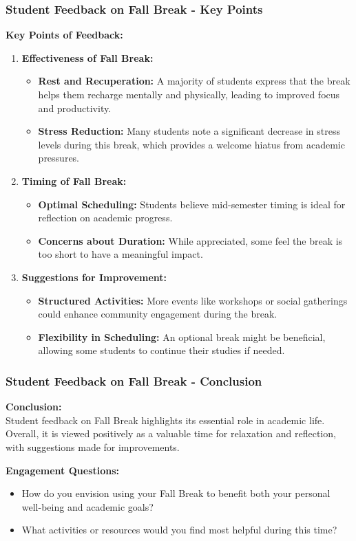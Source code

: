 \documentclass[aspectratio=169]{beamer}
\begin{document}
\begin{frame}[fragile]
    \frametitle{Student Feedback on Fall Break - Key Points}
    \textbf{Key Points of Feedback:}

    \begin{enumerate}
        \item \textbf{Effectiveness of Fall Break:}
            \begin{itemize}
                \item \textbf{Rest and Recuperation:} 
                    A majority of students express that the break helps them recharge mentally and physically, leading to improved focus and productivity.
                \item \textbf{Stress Reduction:}
                    Many students note a significant decrease in stress levels during this break, which provides a welcome hiatus from academic pressures.
            \end{itemize}
        \item \textbf{Timing of Fall Break:}
            \begin{itemize}
                \item \textbf{Optimal Scheduling:} 
                    Students believe mid-semester timing is ideal for reflection on academic progress.
                \item \textbf{Concerns about Duration:} 
                    While appreciated, some feel the break is too short to have a meaningful impact.
            \end{itemize}
        \item \textbf{Suggestions for Improvement:}
            \begin{itemize}
                \item \textbf{Structured Activities:} 
                    More events like workshops or social gatherings could enhance community engagement during the break.
                \item \textbf{Flexibility in Scheduling:} 
                    An optional break might be beneficial, allowing some students to continue their studies if needed.
            \end{itemize}
    \end{enumerate}
\end{frame}

\begin{frame}[fragile]
    \frametitle{Student Feedback on Fall Break - Conclusion}
    \textbf{Conclusion:} \\
    Student feedback on Fall Break highlights its essential role in academic life. Overall, it is viewed positively as a valuable time for relaxation and reflection, with suggestions made for improvements.

    \textbf{Engagement Questions:}
    \begin{itemize}
        \item How do you envision using your Fall Break to benefit both your personal well-being and academic goals?
        \item What activities or resources would you find most helpful during this time?
    \end{itemize}
\end{frame}
\end{document}
